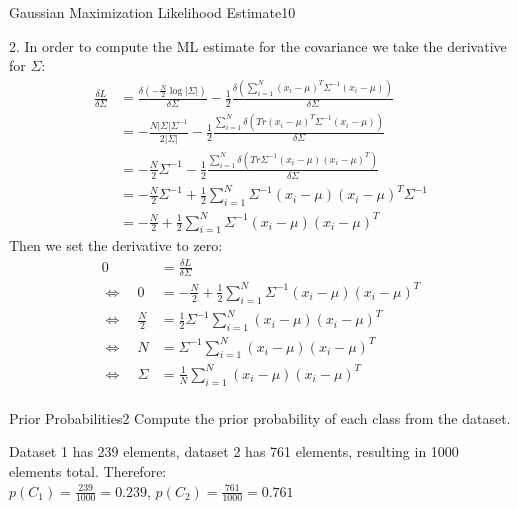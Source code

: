 \begin{questions}
\begin{question}{Gaussian Maximization Likelihood Estimate}{10}
\begin{answer}
2. In order to compute the ML estimate for the covariance we take the derivative for $\Sigma$:
\begin{align*}
\frac{\delta L}{\delta \Sigma} &= \frac{\delta (-\frac{N}{2} \log |\Sigma |)}{\delta \Sigma} - \frac{1}{2} \frac{\delta (\sum_{i=1}^{N}(x_i-\mu )^T \Sigma^{-1}(x_i-\mu ))}{\delta \Sigma}\\
&= -\frac{N|\Sigma |\Sigma^{-1}}{2|\Sigma |}-\frac{1}{2} \frac{\sum_{i=1}^{N} \delta (Tr(x_i-\mu )^T \Sigma^{-1}(x_i-\mu ))}{\delta \Sigma} \\
&= -\frac{N}{2} \Sigma^{-1} - \frac{1}{2} \frac{\sum_{i=1}^{N} \delta ( Tr\Sigma^{-1}(x_i-\mu )(x_i-\mu )^T)}{\delta \Sigma} \\
&= -\frac{N}{2} \Sigma^{-1} + \frac{1}{2} \sum_{i=1}^{N} \Sigma^{-1} (x_i-\mu )(x_i-\mu )^T \Sigma^{-1} \\
&= -\frac{N}{2} + \frac{1}{2} \sum_{i=1}^{N} \Sigma^{-1} (x_i-\mu )(x_i-\mu )^T
\end{align*}
Then we set the derivative to zero:
\begin{align*}
0 &= \frac{\delta L}{\delta \Sigma} \\
\Leftrightarrow \quad 0 &= -\frac{N}{2} + \frac{1}{2} \sum_{i=1}^{N} \Sigma^{-1} (x_i-\mu )(x_i-\mu )^T \\
\Leftrightarrow \quad \frac{N}{2} &= \frac{1}{2} \Sigma^{-1} \sum_{i=1}^{N} (x_i-\mu )(x_i-\mu )^T \\
\Leftrightarrow \quad N &= \Sigma^{-1} \sum_{i=1}^{N} (x_i-\mu )(x_i-\mu )^T \\
\Leftrightarrow \quad \Sigma &= \frac{1}{N} \sum_{i=1}^{N} (x_i-\mu )(x_i-\mu )^T \\
\end{align*}

\end{answer}
\end{question}



\begin{question}{Prior Probabilities}{2}
Compute the prior probability of each class from the dataset. 

\begin{answer}
Dataset 1 has 239 elements, dataset 2 has 761 elements, resulting in 1000 elements total. Therefore:\\
$p(C_1) = \frac{239}{1000}=0.239$, $p(C_2) = \frac{761}{1000}=0.761$
\end{answer}

\end{question}



\end{questions}
